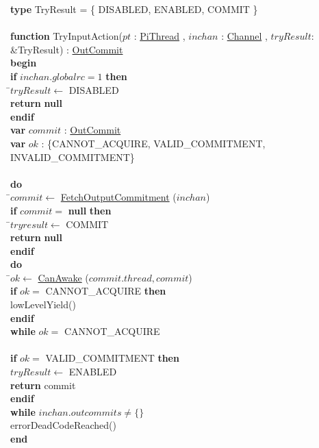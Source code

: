 \documentclass[a4paper,11pt]{article}
\newenvironment{program}{
  \begin{sffamily}
  \begin{scriptsize}
  \begin{tabbing}}
 {\end{tabbing}
  \end{scriptsize}
  \end{sffamily}}
\newcommand{\kw}[1]{\textsf{\textbf{#1}}}
\newcommand{\pindent}{\hspace{2em}\=}
\newcommand{\synchro}[1]{\textcolor{synchrocolor}{#1}}
\newcommand{\myref}[1]{
  \hyperref[#1]{#1}
}
\begin{document}
\begin{program}
  \kw{type} TryResult = \{ DISABLED, ENABLED, COMMIT \} \\
\\
  \kw{function} TryInputAction($pt$ : \myref{PiThread}, $inchan$ : \myref{Channel} , $tryResult$: \&TryResult) : \myref{OutCommit} \\
  \kw{begin} \\
  \pindent\kw{if} $inchan.globalrc = 1$ \kw{then} \\
  \>\pindent$tryResult \leftarrow$ DISABLED \\
  \>\>\kw{return} \kw{null} \\
  \>\kw{endif} \\
  \>\kw{var} $commit$ : \myref{OutCommit} \\
  \>\kw{var} $ok$ : \{CANNOT\_ACQUIRE, VALID\_COMMITMENT, INVALID\_COMMITMENT\} \\
  \>\\
  \>\kw{do} \\
  \>\pindent$commit \leftarrow$ \myref{FetchOutputCommitment}($inchan$) \\
  \>\>\kw{if} $commit =$ \kw{null} \kw{then} \\
  \>\>\pindent$tryresult \leftarrow$ COMMIT \\
  \>\>\>\kw{return} \kw{null} \\
  \>\>\kw{endif} \\

  \>\>\kw{do} \\
  \>\>\pindent$ok \leftarrow$ \myref{CanAwake}($commit.thread, commit$) \\
  \>\>\>\kw{if} $ok =$ CANNOT\_ACQUIRE \kw{then} \\
  \>\>\>\pindent\synchro{lowLevelYield()} \\
  \>\>\>\kw{endif} \\
  \>\>\kw{while} $ok =$ CANNOT\_ACQUIRE \\
  \>\>\\
  \>\>\kw{if} $ok =$ VALID\_COMMITMENT \kw{then} \\
  \>\>\> $tryResult \leftarrow$ ENABLED \\
  \>\>\> \kw{return} commit \\
  \>\>\kw{endif} \\
  \>\kw{while} $inchan.outcommits \neq \{\}$ \\
  \> errorDeadCodeReached() \\
  \kw{end}
\end{program}
\end{document}

